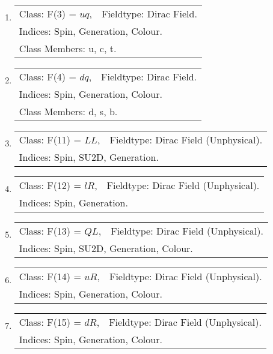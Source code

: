 \documentclass[11pt]{article}
\begin{document}
\begin{enumerate}
\item 
\begin{tabular}{ll}
Class: F(3) = $ uq $, &  Fieldtype: Dirac Field.\\ 
\multicolumn{2}{l}{Indices: Spin, Generation, Colour.}\\ 
\multicolumn{2}{l}{Class Members: u, c, t.}
\end{tabular}
\item 
\begin{tabular}{ll}
Class: F(4) = $ dq $, &  Fieldtype: Dirac Field.\\ 
\multicolumn{2}{l}{Indices: Spin, Generation, Colour.}\\ 
\multicolumn{2}{l}{Class Members: d, s, b.}
\end{tabular}
\item 
\begin{tabular}{ll}
Class: F(11) = $ LL $, &  Fieldtype: Dirac Field (Unphysical).\\ 
\multicolumn{2}{l}{Indices: Spin, SU2D, Generation.}\\ 
\end{tabular}
\item 
\begin{tabular}{ll}
Class: F(12) = $ lR $, &  Fieldtype: Dirac Field (Unphysical).\\ 
\multicolumn{2}{l}{Indices: Spin, Generation.}\\ 
\end{tabular}
\item 
\begin{tabular}{ll}
Class: F(13) = $ QL $, &  Fieldtype: Dirac Field (Unphysical).\\ 
\multicolumn{2}{l}{Indices: Spin, SU2D, Generation, Colour.}\\ 
\end{tabular}
\item 
\begin{tabular}{ll}
Class: F(14) = $ uR $, &  Fieldtype: Dirac Field (Unphysical).\\ 
\multicolumn{2}{l}{Indices: Spin, Generation, Colour.}\\ 
\end{tabular}
\item 
\begin{tabular}{ll}
Class: F(15) = $ dR $, &  Fieldtype: Dirac Field (Unphysical).\\ 
\multicolumn{2}{l}{Indices: Spin, Generation, Colour.}\\ 
\end{tabular}

\end{enumerate}
\end{document}
